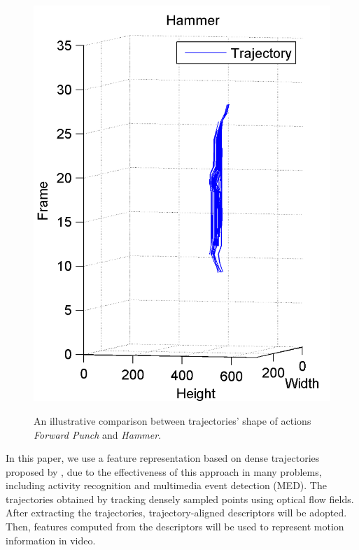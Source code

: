 \documentclass[review]{elsarticle}
\begin{document}
\begin{figure}
\begin{center}
{			\includegraphics[scale=0.5]{Hammer_TOP.png}
		}
	\end{center}
	\caption{An illustrative comparison between trajectories' shape of actions \textit{Forward Punch} and \textit{Hammer}.}
	\label{fig:Illustration}
\end{figure}

In this paper, we use a feature representation based on dense trajectories proposed by \cite{wang2011densetraj}, due to the effectiveness of this approach in many problems, including  activity recognition and multimedia event detection (MED). The trajectories obtained by tracking densely sampled points using optical flow fields. After extracting the trajectories, trajectory-aligned descriptors will be adopted. Then, features computed from the descriptors will be used to represent motion information in video.
\end{document}
